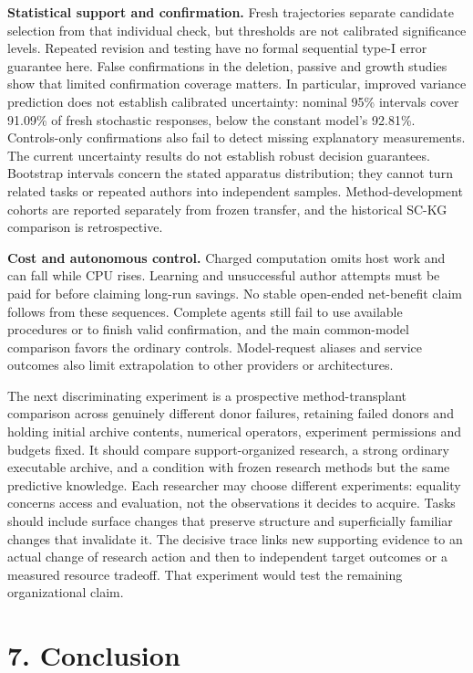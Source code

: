 \documentclass[twoside,11pt]{article}
\begin{document}
\textbf{Statistical support and confirmation.} Fresh trajectories separate candidate selection from that individual check, but thresholds are not calibrated significance levels. Repeated revision and testing have no formal sequential type-I error guarantee here. False confirmations in the deletion, passive and growth studies show that limited confirmation coverage matters. In particular, improved variance prediction does not establish calibrated uncertainty: nominal 95\% intervals cover 91.09\% of fresh stochastic responses, below the constant model's 92.81\%. Controls-only confirmations also fail to detect missing explanatory measurements. The current uncertainty results do not establish robust decision guarantees. Bootstrap intervals concern the stated apparatus distribution; they cannot turn related tasks or repeated authors into independent samples. Method-development cohorts are reported separately from frozen transfer, and the historical SC-KG comparison is retrospective.


\textbf{Cost and autonomous control.} Charged computation omits host work and can fall while CPU rises. Learning and unsuccessful author attempts must be paid for before claiming long-run savings. No stable open-ended net-benefit claim follows from these sequences. Complete agents still fail to use available procedures or to finish valid confirmation, and the main common-model comparison favors the ordinary controls. Model-request aliases and service outcomes also limit extrapolation to other providers or architectures.


The next discriminating experiment is a prospective method-transplant comparison across genuinely different donor failures, retaining failed donors and holding initial archive contents, numerical operators, experiment permissions and budgets fixed. It should compare support-organized research, a strong ordinary executable archive, and a condition with frozen research methods but the same predictive knowledge. Each researcher may choose different experiments: equality concerns access and evaluation, not the observations it decides to acquire. Tasks should include surface changes that preserve structure and superficially familiar changes that invalidate it. The decisive trace links new supporting evidence to an actual change of research action and then to independent target outcomes or a measured resource tradeoff. That experiment would test the remaining organizational claim.


\section*{7. Conclusion}
\end{document}
